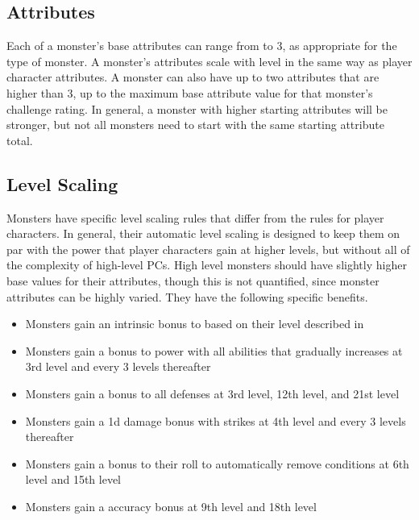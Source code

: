     \subsection{Attributes}
        Each of a monster's base attributes can range from  to 3, as appropriate for the type of monster.
        A monster's attributes scale with level in the same way as player character attributes.
        A monster can also have up to two attributes that are higher than 3, up to the maximum base attribute value for that monster's challenge rating.
        In general, a monster with higher starting attributes will be stronger, but not all monsters need to start with the same starting attribute total.

    \subsection{Level Scaling}
        Monsters have specific level scaling rules that differ from the rules for player characters.
        In general, their automatic level scaling is designed to keep them on par with the power that player characters gain at higher levels, but without all of the complexity of high-level PCs.
        High level monsters should have slightly higher base values for their attributes, though this is not quantified, since monster attributes can be highly varied.
        They have the following specific benefits.
        \begin{itemize}
            \item Monsters gain an intrinsic bonus to  based on their level described in 
            \item Monsters gain a  bonus to power with all abilities that gradually increases at 3rd level and every 3 levels thereafter
            \item Monsters gain a  bonus to all defenses at 3rd level, 12th level, and 21st level
            \item Monsters gain a \plus1d damage bonus with strikes at 4th level and every 3 levels thereafter
            \item Monsters gain a  bonus to their roll to automatically remove conditions at 6th level and 15th level
            \item Monsters gain a  accuracy bonus at 9th level and 18th level
        \end{itemize}

